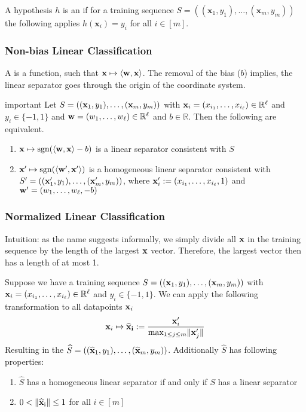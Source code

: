 A hypothesis $h$ is an  if for a training sequence $S = ((\mathbf{x}_{1}, y_{1}), \ldots,(\mathbf{x}_{m}, y_{m}))$ the following applies $h(\mathbf{x}_i) = y_i$ for all $i \in [m]$.

\subsubsection{Non-bias Linear Classification}
A  is a function, such that $\mathbf{x} \mapsto \langle\mathbf{w},\mathbf{x}\rangle$. The removal of the bias ($b$) implies, the linear separator goes through the origin of the coordinate system.	
\begin{theorem}{important}
Let $S=((\mathbf{x}_{1}, y_{1}), \ldots,(\mathbf{x}_{m}, y_{m}))$ with $\mathbf{x}_{i}=(x_{i _1}, \ldots, x_{i_\ell}) \in \mathbb{R}^\ell$ and $y_{i} \in\{-1,1\}$ and $\mathbf{w}=(w_{1}, \ldots, w_\ell) \in \mathbb{R}^\ell$ and $b \in \mathbb{R}$. Then the following are equivalent.
\begin{enumerate}
	\item $\mathbf{x} \mapsto \operatorname{sgn}(\langle\mathbf{w}, \mathbf{x}\rangle- b)$ is a linear separator consistent with $S$
	\item $\mathbf{x}^{\prime} \mapsto \operatorname{sgn}(\langle\mathbf{w}^\prime, \mathbf{x}^\prime\rangle)$ is a homogeneous linear separator consistent with $S^\prime=((\mathbf{x}_1^\prime, y_1), \ldots,(\mathbf{x}_m^\prime, y_m))$,  where $\mathbf{x}_i^\prime :=(x_{i_1}, \ldots, x_{i_\ell}, 1) $ and $\mathbf{w}^\prime=(w_{1}, \ldots, w_\ell,-b)$
\end{enumerate}
\end{theorem}
\subsubsection{Normalized Linear Classification}
Intuition: as the name suggests informally, we simply divide all $\mathbf{x}$ in the training sequence by the length of the largest $\mathbf{x}$ vector. Therefore, the largest vector then has a length of at most 1.

Suppose we have a training sequence $S=((\mathbf{x}_1, y_1), \ldots,(\mathbf{x}_{m}, y_{m}))$ with $\mathbf{x}_{i}=(x_{i_1}, \ldots, x_{i_\ell}) \in \mathbb{R}^\ell$ and $y_{i} \in\{-1,1\}$. We can apply the following transformation to all datapoints $\mathbf{x}_i$
\begin{equation}
\mathbf{x}_{i} \mapsto \widehat{\mathbf{x}}_{\mathbf{i}} :=\frac{\mathbf{x}_{i}^{\prime}}{\max _{1 \leq j \leq m}\lVert\mathbf{x}_{j}^{\prime}\rVert}
\end{equation}
Resulting in the  $\widehat{S}=((\widehat{\mathbf{x}}_{1}, y_{1}), \ldots,(\widehat{\mathbf{x}}_{m}, y_{m}))$. Additionally $\widehat{S}$ has following properties: 
\begin{enumerate}
	\item $\widehat{S}$ has a homogeneous linear separator if and only if $S$ has a linear separator
	\item $0 < \lVert\widehat{\mathbf{x}}_{\mathrm{i}}\rVert \leq 1 $ for all $ i \in [m]$
\end{enumerate}
